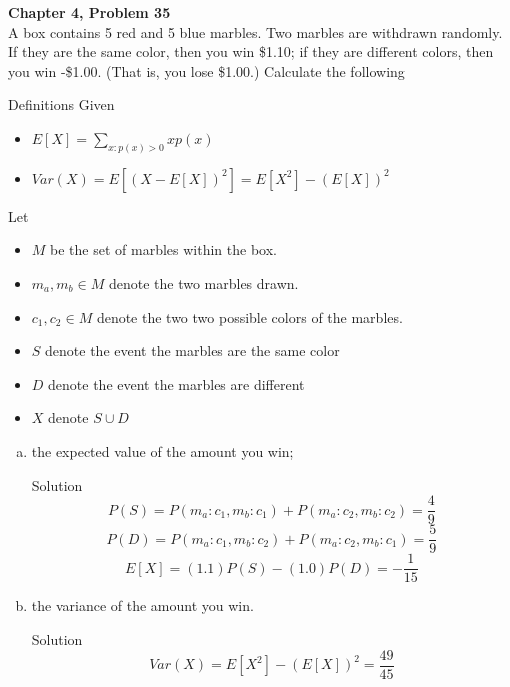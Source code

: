 \documentclass{article}
\begin{document}
\begin{spacing}{1.1}
\newpage
\begin{homeworkProblem}
  {\bf Chapter 4, Problem 35}\\
  A box contains 5 red and 5 blue marbles. Two marbles are withdrawn 
  randomly. If they are the same color, then you win \$1.10; if they 
  are different colors, then you win -\$1.00. (That is, you lose \$1.00.) 
  Calculate the following
  \begin{homeworkSection}{Definitions}
    Given
      \begin{itemize}
        \item $E[ X] = \sum\limits_{x:p( x) > 0}{ x p( x)}$
        \item $Var( X) = E[ (X - E[ X])^2] = E[ X^2] - (E[ X])^2$
      \end{itemize}
    Let
      \begin{itemize}
        \item $M$ be the set of marbles within the box.
        \item $m_a, m_b \in M$ denote the two marbles drawn.
        \item $c_1, c_2 \in M$ denote the two two possible colors of the marbles.
        \item $S$ denote the event the marbles are the same color
        \item $D$ denote the event the marbles are different
        \item $X$ denote $S \cup D$
      \end{itemize}
  \end{homeworkSection}
  \begin{enumerate}[(a)]
    \item the expected value of the amount you win;
      \begin{homeworkSection}{Solution}
        \[P( S) = P( m_a: c_1, m_b:c_1) + P( m_a:c_2, m_b:c_2) = \frac{ 4}{ 9}\]
        \[P( D) = P( m_a: c_1, m_b:c_2) + P( m_a:c_2, m_b:c_1) = \frac{ 5}{ 9}\]
        \[E[ X] = (1.1) P( S) - (1.0) P( D) = -\frac{ 1}{ 15}\]
      \end{homeworkSection}
    \item the variance of the amount you win.
      \begin{homeworkSection}{Solution}
        \[Var( X) = E[ X^2] - (E[ X])^2 = \frac{ 49}{ 45}\]
      \end{homeworkSection}
  \end{enumerate}
\end{homeworkProblem}


\end{spacing}
\end{document}
